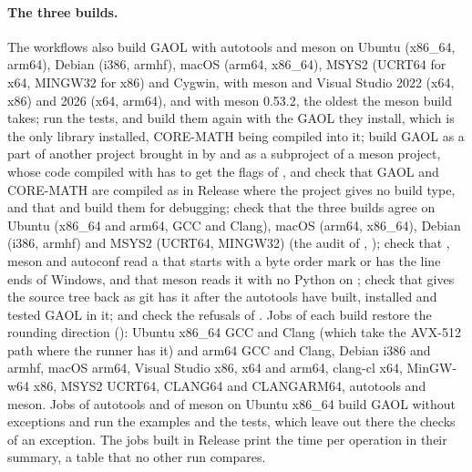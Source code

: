 \paragraph{The three builds.} The workflows also build GAOL with autotools
and meson on Ubuntu (x86\_64, arm64), Debian (i386, armhf), macOS (arm64,
x86\_64), MSYS2 (UCRT64 for x64, MINGW32 for x86) and Cygwin, with meson and
Visual Studio 2022 (x64, x86) and 2026 (x64, arm64), and with meson 0.53.2, the oldest
the meson build takes; run the tests, and build them again with the GAOL
they install, which is the only library installed, CORE-MATH being compiled
into it; build GAOL as a part of another project brought in by
 and as a subproject of a meson project, whose code
compiled with  has to get the flags of , and
check that GAOL and CORE-MATH are compiled as in Release where the project
gives no build type, and that  and 
build them for debugging;\newinvfive{} check that the three builds agree on
Ubuntu (x86\_64 and arm64, GCC and Clang), macOS (arm64, x86\_64), Debian (i386,
armhf) and MSYS2 (UCRT64, MINGW32) (the audit of ,
); check that
, meson and autoconf read a  that starts
with a byte order mark or has the line ends of Windows, and that meson reads
it with no Python on ; check that  gives the
source tree back as git has it after the autotools have built, installed
and tested GAOL in it; and check the refusals of .
Jobs of each build restore the rounding direction
(): Ubuntu x86\_64 GCC and Clang (which
take the AVX-512 path where the runner has it) and arm64 GCC and Clang,
Debian i386 and armhf, macOS arm64, Visual Studio x86, x64 and arm64, clang-cl x64, MinGW-w64 x86, MSYS2 UCRT64, CLANG64 and CLANGARM64, autotools and
meson. Jobs of autotools and of meson on Ubuntu x86\_64 build GAOL without
exceptions and run the examples and the tests, which leave out there the
checks of an exception. The jobs built in Release print the time per
operation in their summary, a table that no other run compares.

